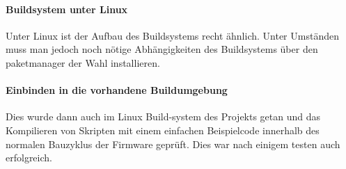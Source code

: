 \paragraph*{Buildsystem unter Linux}
Unter Linux ist der Aufbau des Buildsystems recht ähnlich. Unter Umständen muss man jedoch noch nötige Abhängigkeiten des Buildsystems über den paketmanager der Wahl installieren. \\

\paragraph*{Einbinden in die vorhandene Buildumgebung}
Dies wurde dann auch im Linux Build-system des Projekts getan und das Kompilieren von Skripten mit einem einfachen Beispielcode innerhalb des normalen Bauzyklus der Firmware geprüft. Dies war nach einigem testen auch erfolgreich.
